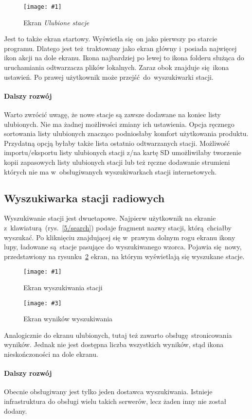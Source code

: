 \documentclass[polish]{aghengthesis}
\newcommand{\imgint}[4]{
	\begin{figure}[{#4}]
		\centering
		\texttt{[image: \#1]}
		\caption{#2}
		\label{#1}
	\end{figure}
}
\newcommand{\imgh}[3]{\imgint{#1}{#2}{#3}{H}}
\newcommand{\imgintss}[5]{
	\begin{figure}[{#5}]
		\centering
		\begin{minipage}{.45\textwidth}
			\centering
			\texttt{[image: \#1]}
			\caption{#2}
			\label{#1}
		\end{minipage}%
		\hfill
		\begin{minipage}{.45\textwidth}
			\centering
			\texttt{[image: \#3]}
			\caption{#4}
			\label{#3}
		\end{minipage}
	\end{figure}
}
\newcommand{\imghss}[4]{\imgintss{#1}{#2}{#3}{#4}{H}}
\begin{document}
			\imgh{5/fav}{Ekran \textit{Ulubione stacje}}{0.5}
			
			Jest to także ekran startowy. Wyświetla się on jako pierwszy po starcie programu. Dlatego jest też traktowany jako ekran główny i~posiada najwięcej ikon akcji na dole ekranu.
			Ikona najbardziej po lewej to ikona folderu służąca do uruchamiania odtwarzacza plików lokalnych. Zaraz obok znajduje się ikona ustawień. Po prawej użytkownik może przejść do wyszukiwarki stacji.
			
			\paragraph{Dalszy rozwój}
				Warto zwrócić uwagę, że nowe stacje są zawsze dodawane na koniec listy ulubionych. Nie ma żadnej możliwości zmiany ich ustawienia. Opcja ręcznego sortowania listy ulubionych znacząco podniosłaby komfort użytkowania produktu. Przydatną opcją byłaby także lista ostatnio odtwarzanych stacji. Możliwość importu/eksportu listy ulubionych stacji z/na kartę SD umożliwiłaby tworzenie kopii zapasowych listy ulubionych stacji lub też ręczne dodawanie strumieni których nie ma w~obsługiwanych wyszukiwarkach stacji internetowych.
			
		\subsection{Wyszukiwarka stacji radiowych}
			Wyszukiwanie stacji jest dwuetapowe. Najpierw użytkownik na ekranie z~klawiaturą (rys.~\ref{5/search}) podaje fragment nazwy stacji, którą chciałby wyszukać. Po kliknięciu znajdującej się w~prawym dolnym rogu ekranu ikony lupy, ładowane są stacje pasujące do wyszukiwanego wzorca. Pojawia się nowy, przedstawiony na rysunku~\ref{5/searchres} ekran, na którym wyświetlają się wyszukane stacje.
			
			\imghss{5/search}{Ekran wyszukiwania stacji}{5/searchres}{Ekran wyników wyszukiwania}
			
			Analogicznie do ekranu ulubionych, tutaj też zawarto obsługę stronicowania wyników. Jednak nie jest dostępna liczba wszystkich wyników, stąd ikona nieskończoności na dole ekranu.
			
			\paragraph{Dalszy rozwój}
				Obecnie obsługiwany jest tylko jeden dostawca wyszukiwania. Istnieje infrastruktura do obsługi wielu takich serwerów, lecz żaden inny nie został dodany.
			
\end{document}
